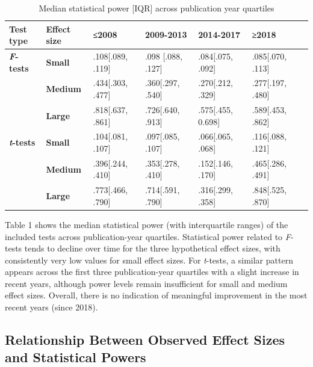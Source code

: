 \documentclass[authordate, meta, issue]{jote-new-article}
\begin{document}
		\begin{table}
        \caption{Median statistical power [IQR] across publication year quartiles}
		\begin{tabularx}{\textwidth}{@{} l l l l l l l @{}}
			\hline \textbf{Test type} & \textbf{Effect size} & \textbf{≤2008} & \textbf{2009-2013}
			& \textbf{2014-2017} & \textbf{≥2018} \\

			\hline \textbf{\emph{F}-tests} & \textbf{Small} & .108[.089, .119] &
			.098 [.088, .127] & .084[.075, .092] & .085[.070, .113] \\

			  & \textbf{Medium} & .434[.303, .477] & .360[.297, .540] & .270[.212, .329]
			& .277[.197, .480] \\

			  & \textbf{Large} & .818[.637, .861] & .726[.640, .913] & .575[.455, 0.698]
			& .589[.453, .862] \\

			\hline \textbf{\emph{t}-tests} & \textbf{Small} & .104[.081, .107] & .097[.085, .107]
			& .066[.065, .068] & .116[.088, .121] \\

			  & \textbf{Medium} & .396[.244, .410] & .353[.278, .410] & .152[.146, .170]
			& .465[.286, .491] \\

			  & \textbf{Large} & .773[.466, .790] & .714[.591, .790] & .316[.299, .358]
			& .848[.525, .870] \\


		\end{tabularx}
	\end{table}

	Table 1 shows the median statistical power (with interquartile ranges) of the included tests across publication-year quartiles. Statistical power related to \emph{F}-tests tends to decline over time for the three hypothetical effect sizes, with consistently very low values for small effect sizes. For \emph{t}-tests, a similar pattern appears across the first three publication-year quartiles with a slight increase in recent years, although power levels remain insufficient for small and medium effect sizes. Overall, there is no indication of meaningful improvement in the most recent years (since 2018).



	\subsection{Relationship Between Observed Effect Sizes and Statistical Powers}
\end{document}
